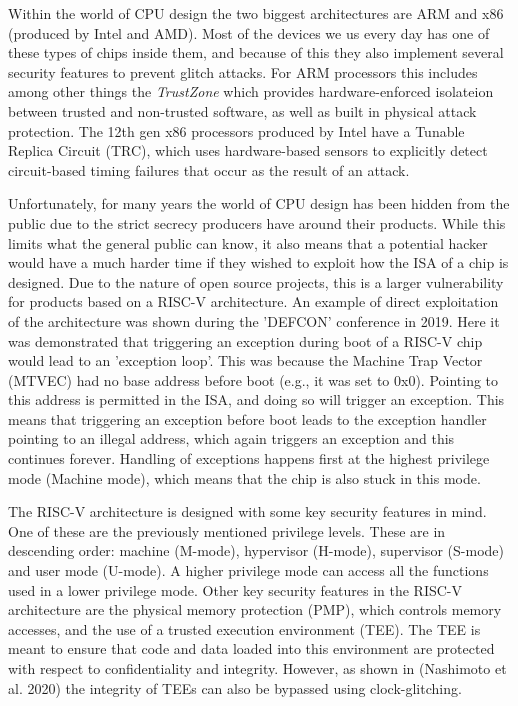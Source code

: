 Within the world of CPU design the two biggest architectures are ARM and x86 (produced by Intel and AMD)\cite{market_share}. Most of the devices we us every day has one of these types of chips inside them, and because of this they also implement several security features to prevent glitch attacks. For ARM processors this includes among other things the \textit{TrustZone} which provides hardware-enforced isolateion between trusted and non-trusted software, as well as built in physical attack protection\cite{arm}. The 12th gen x86 processors produced by Intel have a Tunable Replica Circuit (TRC), which uses hardware-based sensors to explicitly detect circuit-based timing failures that occur as the result of an attack\cite{intel}.  

Unfortunately, for many years the world of CPU design has been hidden from the public due to the strict secrecy producers have around their products. While this limits what the general public can know, it also means that a potential hacker would have a much harder time if they wished to exploit how the ISA of a chip is designed. Due to the nature of open source projects, this is a larger vulnerability for products based on a RISC-V architecture. An example of direct exploitation of the architecture was shown during the 'DEFCON' conference in 2019\cite{isa_exploit}. Here it was demonstrated that triggering an exception during boot of a RISC-V chip would lead to an 'exception loop'. This was because the Machine Trap Vector (MTVEC) had no base address before boot (e.g., it was set to 0x0). Pointing to this address is permitted in the ISA, and doing so will trigger an exception. This means that triggering an exception before boot leads to the exception handler pointing to an illegal address, which again triggers an exception and this continues forever. Handling of exceptions happens first at the highest privilege mode (Machine mode), which means that the chip is also stuck in this mode. 

The RISC-V architecture is designed with some key security features in mind. One of these are the previously mentioned privilege levels. These are in descending order: machine (M-mode), hypervisor (H-mode), supervisor (S-mode) and user mode (U-mode). A higher privilege mode can access all the functions used in a lower privilege mode\cite{source2}. Other key security features in the RISC-V architecture are the physical memory protection (PMP), which controls memory accesses, and the use of a trusted execution environment (TEE). The TEE is meant to ensure that code and data loaded into this environment are protected with respect to confidentiality and integrity. However, as shown in (Nashimoto et al. 2020) the integrity of TEEs can also be bypassed using clock-glitching\cite{source2}.

